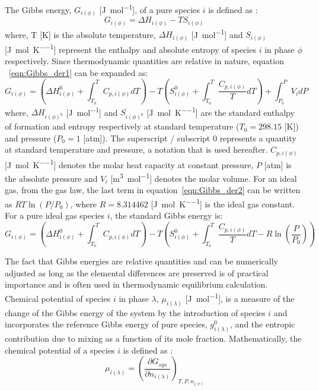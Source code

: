 	The Gibbs energy, $G_{i(\phi)}$ [\si{\joule \per \mole}], of a pure species  $i$ is defined as \cite{Zemansky81}:
	\begin{equation} \label{eqn:Gibbs_der1}
			G_{i(\phi)} = \Delta H_{i(\phi)} - TS_{i(\phi)}
	\end{equation}
	where, T [\si{\kelvin}] is the absolute temperature, $\Delta H_{i(\phi)}$ [\si{\joule \per \mole}] and $S_{i(\phi)}$ [\si{\joule \per \mole \per \kelvin}] represent the enthalpy and absolute entropy of species $i$ in phase $\phi$ respectively. Since thermodynamic quantities are relative in nature, equation ~\eqref{eqn:Gibbs_der1} can be expanded as:
	\begin{equation} \label{eqn:Gibbs_der2}
			G_{i(\phi)} = \left(\Delta H_{i(\phi)}^0 + \int_{T_0}^{T} C_{p,i(\phi)}dT \right) - T\left( S_{i(\phi)}^0  + \int_{T_0}^{T} \frac{C_{p,i(\phi)}}{T}dT \right) + \int_{P_0}^{P} V_i dP
	\end{equation} 
	where, $\Delta H_{i(\phi)^0}$ [\si{\joule \per \mole}] and $S_{i(\phi)^0}$ [\si{\joule \per \mole \per \kelvin}] are the standard enthalpy of formation and entropy respectively at standard temperature ($T_0 = 298.15$ [\si{\kelvin}]) and pressure ($P_0 = 1$ [\si{atm}]). The superscript / subscript $0$ represents a quantity at standard temperature and pressure, a notation that is used hereafter. $C_{p,i(\phi)}$ [\si{\joule \per \mole \per \kelvin}]  denotes the molar heat capacity at constant pressure, $P$ [\si{atm}] is the absolute pressure and $V_i$ [\si{\meter \cubed \per \mole}] denotes the molar volume. For an ideal gas, from the gas law, the last term in equation~\eqref{eqn:Gibbs_der2} can be written as $RT \ln{\left(P/P_0\right)}$, where $R = 8.314462$ [\si{\joule \per \mole \per \kelvin}] is the ideal gas constant. For a pure ideal gas species $i$, the standard Gibbs energy is:
	\begin{equation} \label{eqn:Gibbs_der2}
			G_{i(\phi)} = \left(\Delta H_{i(\phi)}^0 + \int_{T_0}^{T} C_{p,i(\phi)}dT \right) - T\left( S_{i(\phi)}^0  + \int_{T_0}^{T} \frac{C_{p,i(\phi)}}{T}dT  - R \ln{\left(\frac{P}{P_0}\right)}\right) 
	\end{equation} 

	The fact that Gibbs energies are relative quantities and can be numerically adjusted as long as the elemental differences are preserved is of practical importance and is often used in thermodynamic equilibrium calculation. Chemical potential of species $i$ in phase $\lambda$, $\mu_{i(\lambda)}$ [\si{\joule \per \mole}], is a measure of the change of the Gibbs energy of the system by the introduction of species $i$ and incorporates  the reference Gibbs energy of pure species, $g_{i(\lambda)}^0$, and the entropic contribution due to mixing as a function of its mole fraction. Mathematically, the chemical potential of a species $i$ is defined as \cite{Zemansky81}:
    	\begin{equation}
        		\mu_{i(\lambda)} = {\left (\frac{\partial G_{sys}}{\partial n_{i(\lambda)}} \right )}_{T,P,n_{j \neq i}}
    	\end{equation}
    	
